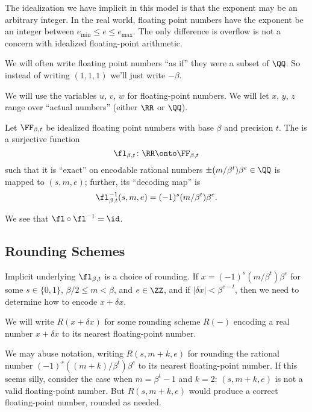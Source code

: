 \begin{rmk}[On ``Idealization'']
  The idealization we have implicit in this model is that the exponent
  may be an arbitrary integer. In the real world, floating point numbers
  have the exponent be an integer between $e_{\text{min}}\leq e\leq e_{\text{max}}$.
  The only difference is overflow is not a concern with idealized
  floating-point arithmetic.
\end{rmk}

\begin{rmk}
We will often write floating point numbers ``as if'' they were a subset
of $\QQ$. So instead of writing $(1,1,1)$ we'll just write $-\beta$.
\end{rmk}

\begin{convention}
  We will use the variables $u$, $v$, $w$ for floating-point numbers.
  We will let $x$, $y$, $z$ range over ``actual numbers'' (either $\RR$
  or $\QQ$).
\end{convention}

\begin{defn}
Let $\FF_{\beta,t}$ be idealized floating point numbers with base
$\beta$ and precision $t$. The  is a surjective
function
\begin{equation}
  \fl_{\beta,t}\colon\RR\onto\FF_{\beta,t}
\end{equation}
such that it is ``exact'' on encodable rational numbers $\pm(m/\beta^{t})\beta^{e}\in\QQ$
is mapped to $(s,m,e)$; further, its ``decoding map'' is
\begin{equation}
  \fl_{\beta,t}^{-1}(s,m,e) = (-1)^{s}(m/\beta^{t})\beta^{e}.
\end{equation}
\end{defn}

\begin{thm}
  We see that $\fl\circ\fl^{-1}=\id$.
\end{thm}

\subsection{Rounding Schemes}

\begin{rmk}
  Implicit underlying $\fl_{\beta,t}$ is a choice of rounding. If
  $x = (-1)^{s}(m/\beta^{t})\beta^{e}$ for some $s\in\{0,1\}$,
  $\beta/2\leq m<\beta$, and $e\in\ZZ$, and if $|\delta x| < \beta^{e-t}$,
  then we need to determine how to encode $x + \delta x$.

  We will write $R(x+\delta x)$ for some rounding scheme $R(-)$ encoding
  a real number $x+\delta x$ to its nearest floating-point number.
\end{rmk}
\begin{notation}
  We may abuse notation, writing $R(s,m+k,e)$ for rounding the rational
  number $(-1)^{s}((m+k)/\beta^{t})\beta^{e}$ to its nearest
  floating-point number. If this seems silly, consider the case when
  $m=\beta^{t}-1$ and $k=2$: $(s,m+k,e)$ is not a valid floating-point
  number. But $R(s,m+k,e)$ would produce a correct floating-point
  number, rounded as needed.
\end{notation}

